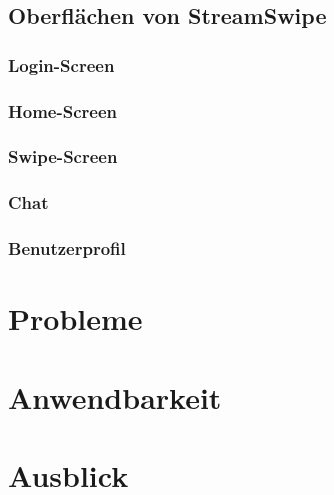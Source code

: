 \documentclass[11pt,a4paper]{article}
\begin{document}
\subsection{Oberflächen von StreamSwipe}
\label{sec:UI-alle}


\subsubsection{Login-Screen}
\label{sec:loginscreen}




\subsubsection{Home-Screen}
\label{sec:homescreen}



\subsubsection{Swipe-Screen}
\label{sec:swipescreen}



\subsubsection{Chat}
\label{sec:UI-Chat}



\subsubsection{Benutzerprofil}
\label{sec:benutzerprofil}



\clearpage
\section{Probleme}
\label{sec:probleme}



\clearpage
\section{Anwendbarkeit}
\label{sec:anwendbarkeit}



\clearpage
\section{Ausblick}
\label{sec:ausblick}

\end{document}
